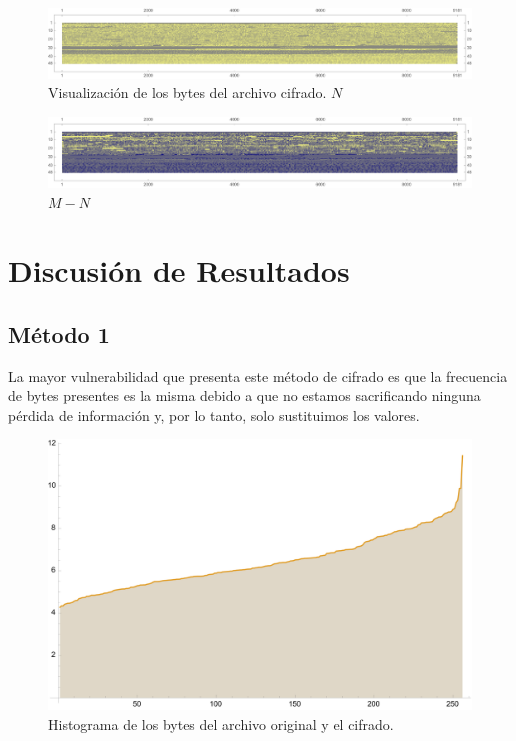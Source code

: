 \documentclass[a4paper]{article}
\begin{document}
\begin{figure}[H]
    \centering
    \includegraphics[width=\textwidth]{bytes2}
    \caption{Visualización de los bytes del archivo
cifrado. $N$}
    \label{fig:DatosOrigM2}
\end{figure}

\begin{figure}[H]
    \centering
    \includegraphics[width=\textwidth]{bytes3}
    \caption{$M-N$}
    \label{fig:DatosOrigM3}
\end{figure}

\newpage
\section{Discusión de Resultados}

\subsection{Método 1}

La mayor vulnerabilidad que presenta este método de cifrado es que la
frecuencia de bytes presentes es la misma debido a que no estamos
sacrificando ninguna pérdida de información y, por lo tanto, solo sustituimos los
valores.

\begin{figure}[H]
    \centering
    \includegraphics[width=\textwidth]{historygram.png}
    \caption{Histograma de los bytes del archivo
original y el cifrado.}
    \label{fig:Histo1}
\end{figure}
\end{document}
